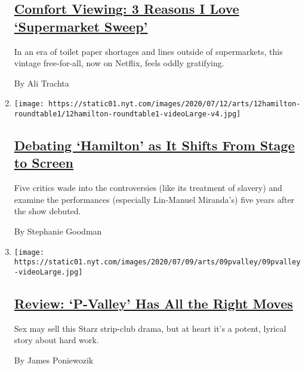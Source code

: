 \begin{enumerate}
  \hypertarget{comfort-viewing-3-reasons-i-love-supermarket-sweep}{%
  \subsection{\texorpdfstring{\href{/2020/07/17/arts/television/supermarket-sweep-netflix-amazon.html}{Comfort
  Viewing: 3 Reasons I Love `Supermarket
  Sweep'}}{Comfort Viewing: 3 Reasons I Love `Supermarket Sweep'}}\label{comfort-viewing-3-reasons-i-love-supermarket-sweep}}

  In an era of toilet paper shortages and lines outside of supermarkets,
  this vintage free-for-all, now on Netflix, feels oddly gratifying.

  By Ali Trachta
\item
  \texttt{[image: https://static01.nyt.com/images/2020/07/12/arts/12hamilton-roundtable1/12hamilton-roundtable1-videoLarge-v4.jpg]}

  \hypertarget{debating-hamilton-as-it-shifts-from-stage-to-screen}{%
  \subsection{\texorpdfstring{\href{/2020/07/10/movies/hamilton-critics-lin-manuel-miranda.html}{Debating
  `Hamilton' as It Shifts From Stage to
  Screen}}{Debating `Hamilton' as It Shifts From Stage to Screen}}\label{debating-hamilton-as-it-shifts-from-stage-to-screen}}

  Five critics wade into the controversies (like its treatment of
  slavery) and examine the performances (especially Lin-Manuel
  Miranda's) five years after the show debuted.

  By Stephanie Goodman
\item
  \texttt{[image: https://static01.nyt.com/images/2020/07/09/arts/09pvalley/09pvalley-videoLarge.jpg]}

  \hypertarget{review-p-valley-has-all-the-right-moves}{%
  \subsection{\texorpdfstring{\href{/2020/07/09/arts/television/p-valley-review-starz.html}{Review:
  `P-Valley' Has All the Right
  Moves}}{Review: `P-Valley' Has All the Right Moves}}\label{review-p-valley-has-all-the-right-moves}}

  Sex may sell this Starz strip-club drama, but at heart it's a potent,
  lyrical story about hard work.

  By James Poniewozik
\end{enumerate}

